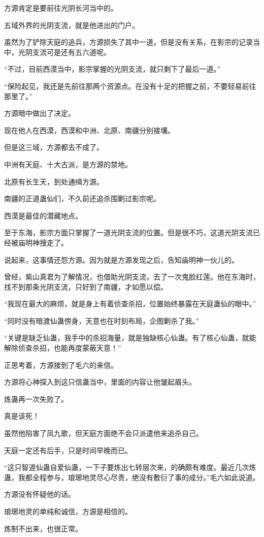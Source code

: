 \begin{this_body}
方源肯定是要前往光阴长河当中的。

五域外界的光阴支流，就是他进出的门户。

虽然为了铲除天庭的追兵，方源损失了其中一道，但是没有关系，在影宗的记录当中，光阴支流可是还有五六道呢。

“不过，目前西漠当中，影宗掌握的光阴支流，就只剩下了最后一道。”

“保险起见，我还是先前往那两个资源点。在没有十足的把握之前，不要轻易前往那里了。”

方源暗中做出了决定。

现在他人在西漠，西漠和中洲、北原、南疆分别接壤。

但是这三域，方源都去不成了。

中洲有天庭、十大古派，是方源的禁地。

北原有长生天，到处通缉方源。

南疆的正道蛊仙们，不久前还追杀围剿过影宗呢。

西漠是最佳的潜藏地点。

至于东海，影宗方面只掌握了一道光阴支流的位置。但是很不巧，这道光阴支流已经被庙明神搜走了。

说起来，这事情还怨方源。因为就是方源发现之后，告知庙明神一伙儿的。

曾经，紫山真君为了解情况，也借助光阴支流，去了一次鬼脸红莲。他在东海时，找不到那条光阴支流，只好到了南疆，才如愿以偿。

“我现在最大的麻烦，就是身上有着侦查杀招，位置始终暴露在天庭蛊仙的眼中。”

“同时没有暗渡仙蛊傍身，天意也在时刻布局，企图剿杀了我。”

“关键是缺乏仙蛊，我手中的杀招海量，就是独缺核心仙蛊。有了核心仙蛊，就能解除侦查杀招，也能再度蒙蔽天意！”

正思考着，方源接到了毛六的来信。

方源将心神探入到这只信蛊当中，里面的内容让他皱起眉头。

炼蛊再一次失败了。

真是该死！

虽然他陷害了凤九歌，但天庭方面绝不会只派遣他来追杀自己。

天庭一定还有后手，只是时间早晚而已。

“这只智道仙蛊自爱仙蛊，一下子要炼出七转层次来，的确颇有难度。最近几次炼蛊，我都全程参与，琅琊地灵尽心尽责，绝没有敷衍了事的成分。”毛六如此说道。

方源没有怀疑他的话。

琅琊地灵的单纯和诚信，方源是相信的。

炼制不出来，也很正常。


\end{this_body}
